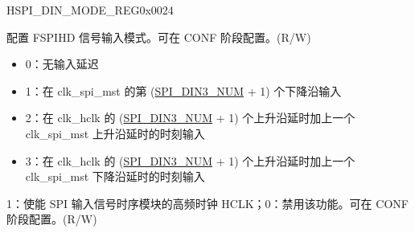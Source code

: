\addtocounter{Regfloat}{-1}
\begin{register}{H}{SPI\_DIN\_MODE\_REG}{0x0024}
\begin{regdesc}\begin{reglist}
\item [接上页]

\label{fielddesc:SPIDIN3MODE}\item [SPI\_DIN3\_MODE] 配置 FSPIHD 信号输入模式。可在 CONF 阶段配置。(R/W)
\begin{itemize}
    \item 0：无输入延迟
    \item 1：在 clk\_spi\_mst 的第 (\hyperref[fielddesc:SPIDIN3NUM]{SPI\_DIN3\_NUM} + 1) 个下降沿输入
    \item 2：在 clk\_hclk 的 (\hyperref[fielddesc:SPIDIN3NUM]{SPI\_DIN3\_NUM} + 1) 个上升沿延时加上一个 clk\_spi\_mst 上升沿延时的时刻输入
    \item 3：在 clk\_hclk 的 (\hyperref[fielddesc:SPIDIN3NUM]{SPI\_DIN3\_NUM} + 1) 个上升沿延时加上一个 clk\_spi\_mst 下降沿延时的时刻输入
\end{itemize}
\label{fielddesc:SPITIMINGHCLKACTIVE}\item [SPI\_TIMING\_HCLK\_ACTIVE] 1：使能 SPI 输入信号时序模块的高频时钟 HCLK；0：禁用该功能。可在 CONF 阶段配置。(R/W)
\end{reglist}\end{regdesc}
\end{register}


